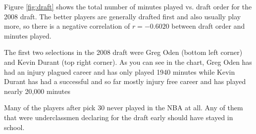 \documentclass[letterpaper, landscape]{exam}
\begin{document}
\begin{questions}
        Figure \ref{fig:draft} shows the total number of minutes played vs.  draft
        order for the 2008 draft.  The better players are generally drafted first
        and also usually play more, so there is a negative correlation of 
        $r = -0.6020$ between draft order and minutes played.

        The first two selections in the 2008 draft were Greg Oden (bottom left
        corner) and Kevin Durant (top right corner).  As you can see in the
        chart, Greg Oden has had an injury plagued career and has only played
        1940 minutes while Kevin Durant has had a successful and so far mostly
        injury free career and has played nearly 20,000 minutes

        Many of the players after pick 30 never played in the NBA at all.  Any
        of them that were underclassmen declaring for the draft early should
        have stayed in school.

\end{questions}
\end{document}
